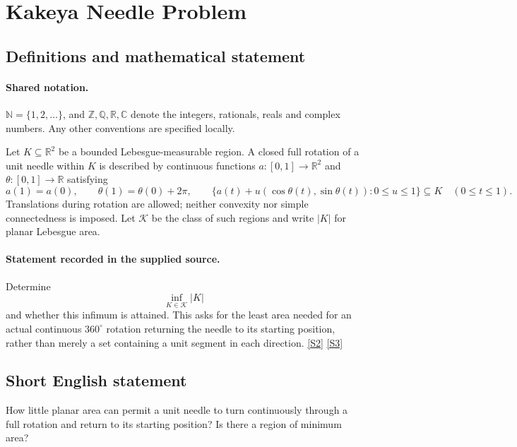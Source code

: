 \documentclass[11pt]{article}
\newcommand{\sref}[2]{\hyperlink{source:#1:#2}{[S#2]}}
\begin{document}
\section{Kakeya Needle Problem}\label{statement}

\subsection{Definitions and mathematical statement}

\paragraph{Shared notation.}$\mathbb N=\{1,2,\ldots\}$, and $\mathbb Z,\mathbb Q,\mathbb R,\mathbb C$ denote the integers, rationals, reals and complex numbers. Any other conventions are specified locally.


Let \(K\subseteq\mathbb R^2\) be a bounded Lebesgue-measurable region.
A closed full rotation of a unit needle within \(K\) is described by
continuous functions \(a:[0,1]\to\mathbb R^2\) and
\(\theta:[0,1]\to\mathbb R\) satisfying
\[
 a(1)=a(0),\qquad \theta(1)=\theta(0)+2\pi,\qquad
 \{a(t)+u(\cos\theta(t),\sin\theta(t)):0\le u\le1\}
       \subseteq K\quad (0\le t\le1).
\]
Translations during rotation are allowed; neither convexity nor simple
connectedness is imposed.  Let \(\mathcal K\) be the class of such regions
and write \(|K|\) for planar Lebesgue area.
\paragraph{Statement recorded in the supplied source.}
Determine
\[
 \inf_{K\in\mathcal K}|K|
\]
and whether this infimum is attained.  This asks for the least area
needed for an actual continuous \(360^\circ\) rotation returning the
needle to its starting position, rather than merely a set containing
a unit segment in each direction. \sref{statement}{2} \sref{statement}{3}
\subsection{Short English statement}
How little planar area can permit a unit needle to turn continuously through a full rotation and return to its starting position? Is there a region of minimum area?
\end{document}
